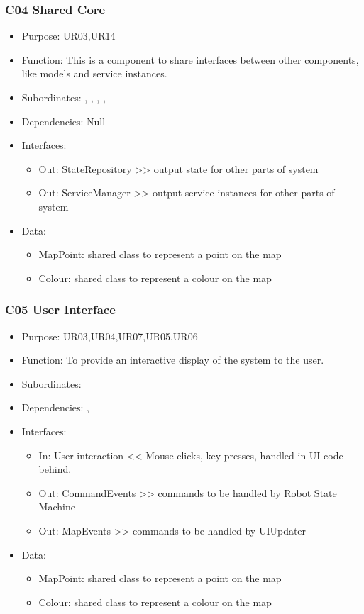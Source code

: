 \subsubsection{C04 Shared Core} \label{compShared}
\begin{itemize}
	\item Purpose: UR03,UR14
	\item Function: This is a component to share interfaces between other components, like models and service instances.
	\item Subordinates: , , , , 
	\item Dependencies: Null
	\item Interfaces:
	\begin{itemize}
		\item Out: StateRepository >> output state for other parts of system
		\item Out: ServiceManager >> output service instances for other parts of system
	\end{itemize}
	\item Data:
	\begin{itemize}
		\item MapPoint: shared class to represent a point on the map
		\item Colour: shared class to represent a colour on the map
	\end{itemize}
\end{itemize}

\subsubsection{C05 User Interface} \label{compUI}
\begin{itemize}
	\item Purpose: UR03,UR04,UR07,UR05,UR06
	\item Function: To provide an interactive display of the system to the user. 
	\item Subordinates: 
	\item Dependencies: , 
	\item Interfaces:
	\begin{itemize}
		\item In: User interaction << Mouse clicks, key presses, handled in UI code-behind.
		\item Out: CommandEvents >> commands to be handled by Robot State Machine 
		\item Out: MapEvents >> commands to be handled by UIUpdater
	\end{itemize}
	\item Data:
	\begin{itemize}
		\item MapPoint: shared class to represent a point on the map
		\item Colour: shared class to represent a colour on the map
	\end{itemize}
\end{itemize}

